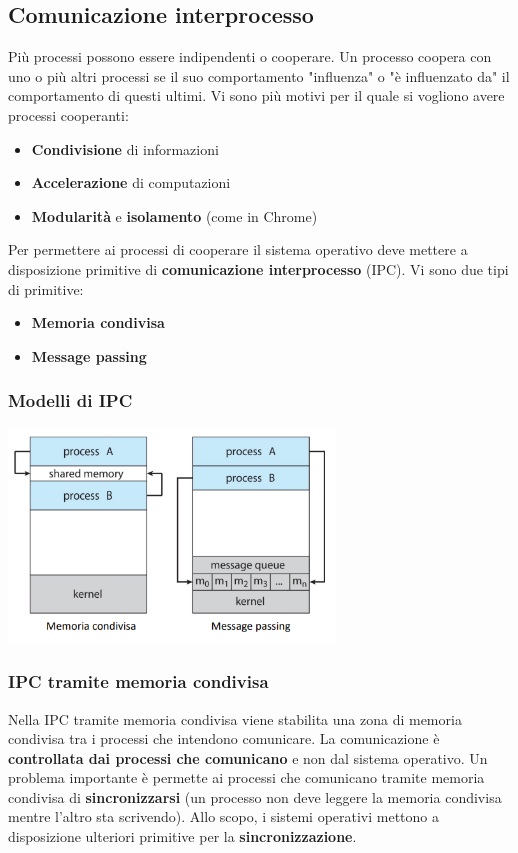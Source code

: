 \documentclass[12pt]{article}
\begin{document}
\subsection{Comunicazione interprocesso}
Più processi possono essere indipendenti o cooperare. Un processo coopera con uno o più altri processi se il suo comportamento "influenza" o "è influenzato da" il comportamento di questi ultimi.
Vi sono più motivi per il quale si vogliono avere processi cooperanti:
\begin{itemize}
    \item \textbf{Condivisione} di informazioni
    \item \textbf{Accelerazione} di computazioni
    \item \textbf{Modularità} e \textbf{isolamento} (come in Chrome)
\end{itemize}
Per permettere ai processi di cooperare il sistema operativo deve mettere a disposizione primitive di \textbf{comunicazione interprocesso} (IPC).
Vi sono due tipi di primitive:
\begin{itemize}
    \item \textbf{Memoria condivisa}
    \item \textbf{Message passing}
\end{itemize}
\subsubsection{Modelli di IPC}
\begin{center}
    \includegraphics[width = 0.65\textwidth]{Images/13.PNG}
\end{center}
\subsubsection{IPC tramite memoria condivisa}
Nella IPC tramite memoria condivisa viene stabilita una zona di memoria condivisa tra i processi che intendono comunicare.
La comunicazione è \textbf{controllata dai processi che comunicano} e non dal sistema operativo.
Un problema importante è permette ai processi che comunicano tramite memoria condivisa di \textbf{sincronizzarsi} (un processo non deve leggere la memoria condivisa mentre l'altro sta scrivendo).
Allo scopo, i sistemi operativi mettono a disposizione ulteriori primitive per la \textbf{sincronizzazione}.
\end{document}

